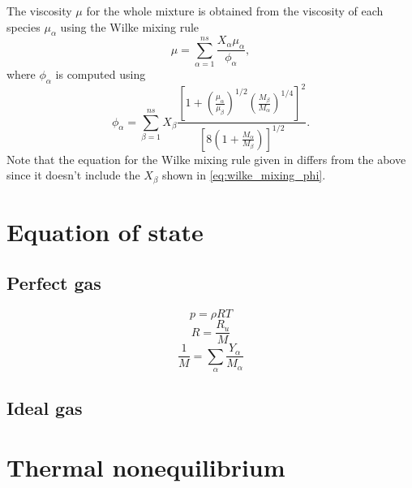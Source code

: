 \documentclass[oneside,a4paper,11pt]{report}
\begin{document}
The viscosity $\mu$ for the whole mixture is obtained from the viscosity of each species $\mu_\alpha$ using the Wilke mixing rule \cite{wilke1950}
\begin{equation}
\mu = \sum_{\alpha = 1}^{ns} \frac{X_\alpha \mu_\alpha}{\phi_\alpha},
\end{equation}
where $\phi_\alpha$ is computed using
\begin{equation}
\label{eq:wilke_mixing_phi}
    \phi_\alpha = \sum_{\beta = 1}^{ns} X_\beta \frac{ \left [ 1 + \left ( \frac{\mu_\alpha}{\mu_\beta} \right )^{1/2} \left ( \frac{M_\beta}{M_\alpha} \right)^{1/4} \right]^2}{ \left [ 8 \left ( 1 + \frac{M_\alpha}{M_\beta} \right ) \right ]^{1/2} }.
\end{equation}
Note that the equation for the Wilke mixing rule given in \cite{palmer2003} differs from the above since it doesn't include the $X_\beta$ shown in \cref{eq:wilke_mixing_phi}. 

\section{Equation of state}

\subsection{Perfect gas}
\begin{equation}
p = \rho R T 
\end{equation}
\begin{equation}
R = \frac{R_u}{M}
\end{equation}
\begin{equation}
\frac{1}{M} = \sum_\alpha \frac{Y_\alpha}{M_\alpha}
\end{equation}

\subsection{Ideal gas}

\section{Thermal nonequilibrium}
\end{document}
